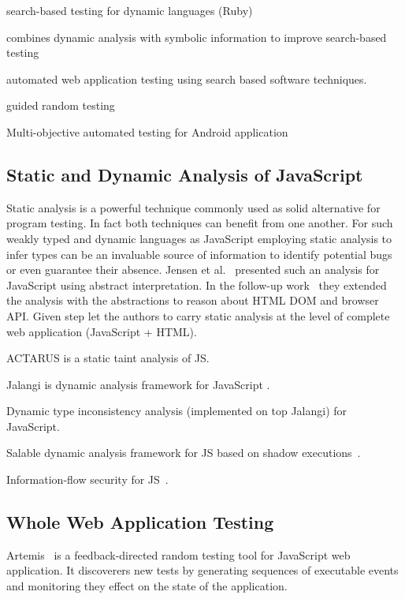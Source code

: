 \documentclass[sigconf]{acmart}
\begin{document}
\cite{mairhofer2011search} search-based testing for dynamic languages (Ruby)

\cite{baars2011symbolic} combines dynamic analysis with symbolic information to improve search-based testing

\cite{alshahwan2011automated} automated web application testing using search based software techniques.

\cite{ma2015grt} guided random testing

\cite{mao2016sapienz} Multi-objective automated testing for Android application

\subsection{Static and Dynamic Analysis of JavaScript}
\label{sub.sec.js.static.anal}

Static analysis is a powerful technique commonly used as solid alternative for program testing. In fact both techniques can benefit from one another. For such weakly typed and dynamic languages as JavaScript employing static analysis to infer types can be an invaluable source of information to identify potential bugs or even guarantee their absence. Jensen et al.~\cite{tajs2009} presented such an analysis for JavaScript using abstract interpretation. In the follow-up work~\cite{dom2011} they extended the analysis with the abstractions to reason about HTML DOM and browser API. Given step let the authors to carry static analysis at the level of complete web application (JavaScript + HTML).
\cite{jquery2014}


ACTARUS is a static taint analysis of JS\cite{guarnieri2011saving}.

Jalangi is dynamic analysis framework for JavaScript \cite{sen2013jalangi}.

Dynamic type inconsistency analysis (implemented on top Jalangi) for JavaScript\cite{pradel2015typedevil}.

Salable dynamic analysis framework for JS based on shadow executions~\cite{create_citation}.

Information-flow security for JS~\cite{hedin2012information}.

\subsection{Whole Web Application Testing}
\label{sub.sec.web.app.test}

Artemis~\cite{artemis2011} is a feedback-directed random testing tool for JavaScript web application. It discoverers new tests by generating sequences of executable events and monitoring they effect on the state of the application. \cite{ail2013}
\end{document}
